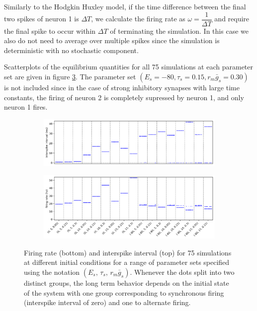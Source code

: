 \documentclass{article}
\begin{document}
Similarly to the Hodgkin Huxley model, if the time difference between the final two spikes of neuron 1 is $\Delta T$, we calculate the firing rate as $\omega = \dfrac{1}{\Delta T}$ and require the final spike to occur within $\Delta T$ of terminating the simulation.
In this case we also do not need to average over multiple spikes since the simulation is deterministic with no stochastic component.

Scatterplots of the equilibrium quantities for all 75 simulations at each parameter set are given in figure \ref{fig:scat}. The parameter set $(E_s = -80, \tau_s = 0.15, r_m \bar g_s = 0.30)$ is not included since in the case of strong inhibitory synapses with large time constants, the firing of neuron 2 is completely supressed by neuron 1, and only neuron 1 fires.

\begin{figure}[h]
	\centering
	\begin{subfigure}[t]{0.8\linewidth}
		\centering
		\includegraphics[width = 1.0\linewidth, trim={0 7 0 0}, clip=true]{ints_scatter.png}
		\label{fig:int}	
	\end{subfigure}%
	\hspace{0.001\linewidth}
	\begin{subfigure}[t]{0.8\linewidth}
		\centering
		\includegraphics[width = 1.0\linewidth, trim={0 0 0 7}, clip=true]{rates_scatter.png}
		\label{fig:rate}	
	\end{subfigure}%
\label{fig:scat}
\caption{Firing rate (bottom) and interspike interval (top) for 75 simulations at different initial conditions for a range of parameter sets specified using the notation $(E_s, \, \tau_s, \, r_m \bar g_s)$. Whenever the dots split into two distinct groups, the long term behavior depends on the initial state of the system with one group corresponding to synchronous firing (interspike interval of zero) and one to alternate firing.}
\end{figure}
\end{document}
